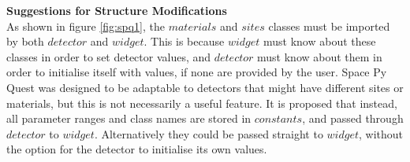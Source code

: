 \documentclass{article}
\begin{document}
\textbf{Suggestions for Structure Modifications}\\
As shown in figure \ref{fig:spq1}, the $materials$ and $sites$ classes
must be imported by both $detector$ and $widget$. This is because
$widget$ must know about these classes in order to set detector
values, and $detector$ must know about them in order to initialise
itself with values, if none are provided by the user. Space Py Quest
was designed to be adaptable to detectors that might have different
sites or materials, but this is not necessarily a useful feature.  It
is proposed that instead, all parameter ranges and class names are
stored in $constants$, and passed through $detector$ to
$widget$. Alternatively they could be passed straight to $widget$,
without the option for the detector to initialise its own values. 

\end{document}
